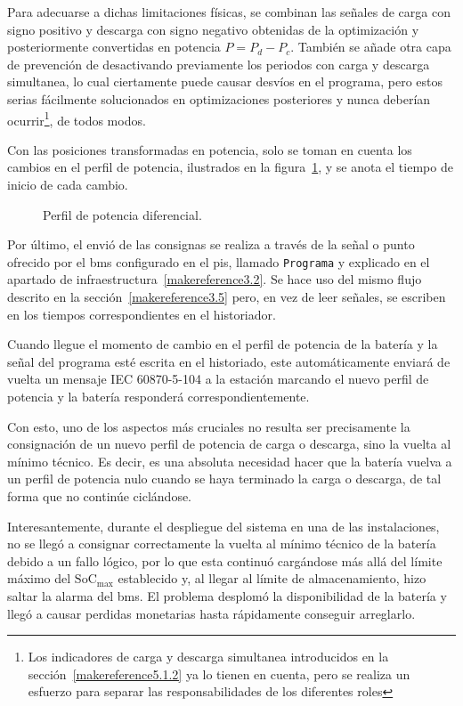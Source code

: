 Para adecuarse a dichas limitaciones físicas, se combinan las señales de carga con signo positivo y descarga con signo negativo obtenidas de la optimización y posteriormente convertidas en potencia \( P = P_{d} - P_{c} \). También se añade otra capa de prevención de desactivando previamente los periodos con carga y descarga simultanea, lo cual ciertamente puede causar desvíos en el programa, pero estos serias fácilmente solucionados en optimizaciones posteriores y nunca deberían ocurrir\footnote{Los indicadores de carga y descarga simultanea introducidos en la sección~\ref{makereference5.1.2} ya lo tienen en cuenta, pero se realiza un esfuerzo para separar las responsabilidades de los diferentes roles}, de todos modos.

Con las posiciones transformadas en potencia, solo se toman en cuenta los cambios en el perfil de potencia, ilustrados en la figura~\ref{fig:diferencia-perfil-potencia}, y se anota el tiempo de inicio de cada cambio.

\begin{figure}
  \centering
  \caption{Perfil de potencia diferencial.}
  \label{fig:diferencia-perfil-potencia}
\end{figure}

Por último, el envió de las consignas se realiza a través de la señal o punto ofrecido por el \gls{bms} configurado en el \gls{pis}, llamado \texttt{Programa} y explicado en el apartado de infraestructura~\ref{makereference3.2}. Se hace uso del mismo flujo descrito en la sección~\ref{makereference3.5} pero, en vez de leer señales, se escriben en los tiempos correspondientes en el historiador.

Cuando llegue el momento de cambio en el perfil de potencia de la batería y la señal del programa esté escrita en el historiado, este automáticamente enviará de vuelta un mensaje IEC 60870-5-104 a la estación marcando el nuevo perfil de potencia y la batería responderá correspondientemente.

Con esto, uno de los aspectos más cruciales no resulta ser precisamente la consignación de un nuevo perfil de potencia de carga o descarga, sino la vuelta al mínimo técnico. Es decir, es una absoluta necesidad hacer que la batería vuelva a un perfil de potencia nulo cuando se haya terminado la carga o descarga, de tal forma que no continúe ciclándose.

Interesantemente, durante el despliegue del sistema en una de las instalaciones, no se llegó a consignar correctamente la vuelta al mínimo técnico de la batería debido a un fallo lógico, por lo que esta continuó cargándose más allá del límite máximo del \( \mathrm{SoC}_{\text{max}} \) establecido y, al llegar al límite de almacenamiento, hizo saltar la alarma del \gls{bms}. El problema desplomó la disponibilidad de la batería y llegó a causar perdidas monetarias hasta rápidamente conseguir arreglarlo.

